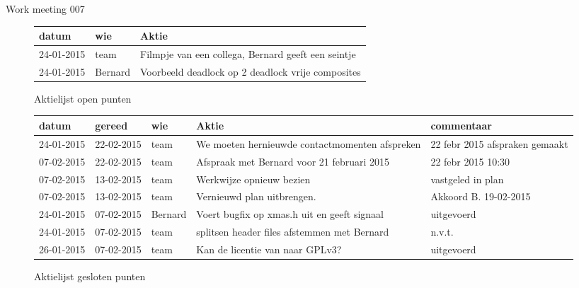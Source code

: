 \documentclass[a4paper,final]{article}
\begin{document}
\begin{Minutes}{Work meeting 007}
\begin{figure}
\begin{tabular}[!h]{|l|l|p{25em}|}
\hline
{\bf datum} & {\bf wie} & {\bf Aktie}\\\hline
24-01-2015  & team      & Filmpje van een collega, Bernard geeft een seintje\\\hline
24-01-2015  & Bernard   & Voorbeeld deadlock op 2 deadlock vrije composites\\\hline
\end{tabular}
\caption{Aktielijst open punten}\label{fig:openpunten}
\end{figure}


\begin{figure}
\begin{tabular}[!h]{|l|l|l|p{10em}|p{10em}|}
\hline
{\bf datum} & {\bf gereed} & {\bf wie} & {\bf Aktie}                                      & commentaar      \\\hline
24-01-2015  & 22-02-2015   & team      & We moeten hernieuwde contactmomenten afspreken   & 22 febr 2015 afspraken gemaakt\\\hline
07-02-2015  & 22-02-2015   & team      & Afspraak met Bernard voor 21 februari 2015       & 22 febr 2015 10:30\\\hline
07-02-2015  & 13-02-2015   & team      & Werkwijze opnieuw bezien                         & vastgeled in plan\\\hline
07-02-2015  & 13-02-2015   & team      & Vernieuwd plan uitbrengen.                       & Akkoord B. 19-02-2015\\\hline
24-01-2015  & 07-02-2015   & Bernard   & Voert bugfix op xmas.h uit en geeft signaal      & uitgevoerd\\\hline
24-01-2015  & 07-02-2015   & team      & splitsen header files afstemmen met Bernard      & n.v.t.\\\hline
26-01-2015  & 07-02-2015   & team      & Kan de licentie van \w{bitpower lib} naar GPLv3? & uitgevoerd\\\hline
\end{tabular}
\caption{Aktielijst gesloten punten}
\end{figure}

\end{Minutes}
\end{document}
